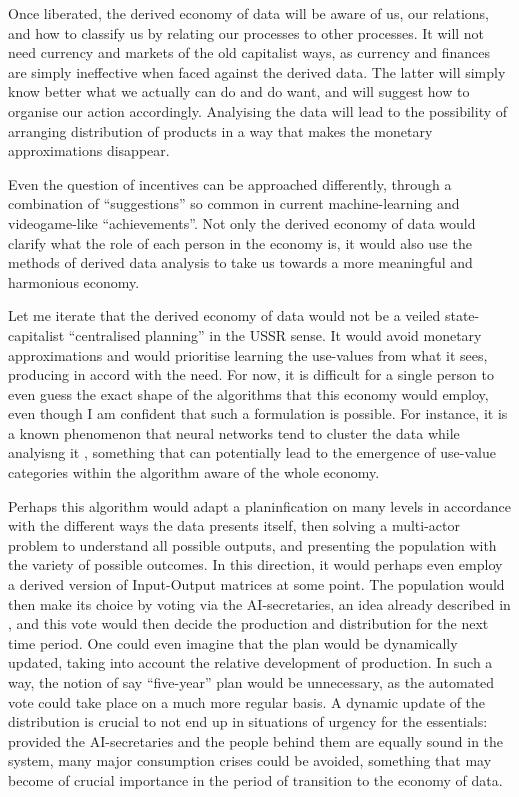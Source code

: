 \documentclass{article}
\begin{document}
Once liberated, the derived economy of data will be aware of us, our relations, and how to classify us by relating our processes to other processes. It will not need currency and markets of the old capitalist ways, as currency and finances are simply ineffective when faced against the derived data. The latter will simply know better what we actually can do and do want, and will suggest how to organise our action accordingly. Analyising the data will lead to the possibility of arranging distribution of products in a way that makes the monetary approximations disappear.

Even the question of incentives can be approached differently, through a combination of
``suggestions'' so common in current machine-learning and videogame-like ``achievements''.
Not only the derived economy of data would clarify what the role
of each person in the economy is, it would also use the methods of
derived data analysis to take us towards a more meaningful and harmonious economy.

Let me iterate that the derived economy of data would not be a veiled state-capitalist “centralised planning” in the USSR sense. It would avoid monetary approximations and would prioritise learning the use-values from what it sees, producing in accord with the need. For now, it is difficult for a single person to even guess the exact shape of the algorithms that this economy would employ,
even though I am confident that such a formulation is possible. For instance, it is a known phenomenon that neural
networks tend to cluster the data while analyisng it \cite{CLUSTERISATION}, something that can potentially lead to the emergence of use-value
categories within the algorithm aware of the whole economy.

Perhaps this algorithm would adapt a planinfication on many levels in accordance with the different ways the data presents itself,
then solving a multi-actor problem to understand all possible outputs, and presenting the population with the variety of possible outcomes. In this direction, it would perhaps even employ a derived version of Input-Output matrices \cite{KANTOROVICH} at some point. The population would then
make its choice by voting via the AI-secretaries, an idea already described in \cite{DWIT}, and this vote would then decide the production and distribution for the next time period. One could even imagine that the plan would be dynamically updated,
taking into account the relative development of production. In such a way, the notion of say ``five-year'' plan would be unnecessary, as the automated vote could take place on a much more regular basis. A dynamic update of the distribution
is crucial to not end up in situations of urgency for the essentials: provided the AI-secretaries and the people behind them
are equally sound in the system, many major consumption crises could be avoided, something that may become of crucial importance in the period of transition to the economy of data.
\end{document}
